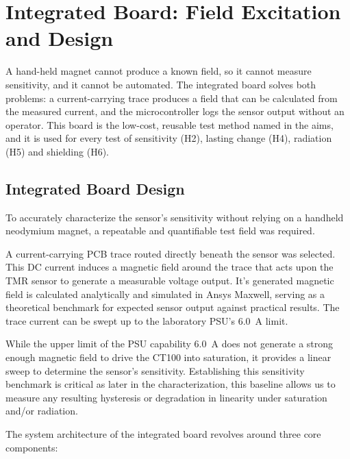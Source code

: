 \documentclass[12pt,a4paper]{article}
\begin{document}
\section{Integrated Board: Field Excitation and Design}
\label{sec:integrated-board}

A hand-held magnet cannot produce a known field, so it cannot measure sensitivity, and it cannot be automated. The integrated board solves both problems: a current-carrying trace produces a field that can be calculated from the measured current, and the microcontroller logs the sensor output without an operator. This board is the low-cost, reusable test method named in the aims, and it is used for every test of sensitivity (H2), lasting change (H4), radiation (H5) and shielding (H6).

\subsection{Integrated Board Design}
\label{sec:integrated-design}

To accurately characterize the sensor's sensitivity without relying on a handheld neodymium magnet, a repeatable and quantifiable test field was required.

A current-carrying PCB trace routed directly beneath the sensor was selected. This DC current induces a magnetic field around the trace that acts upon the TMR sensor to generate a measurable voltage output. It's generated magnetic field is calculated analytically and simulated in Ansys Maxwell, serving as a theoretical benchmark for expected sensor output against practical results. The trace current can be swept up to the laboratory PSU's \SI{6.0}{\ampere} limit. 

While the upper limit of the PSU capability \SI{6.0}{\ampere}  does not generate a strong enough magnetic field to drive the CT100 into saturation, it provides a linear sweep to determine the sensor's sensitivity. Establishing this sensitivity benchmark is critical as later in the characterization, this baseline allows us to measure any resulting hysteresis or degradation in linearity under saturation and/or radiation.

The system architecture of the integrated board revolves around three core components:
\end{document}
